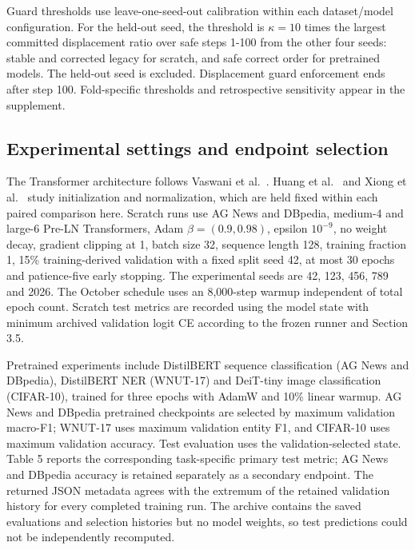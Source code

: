 \documentclass[referee,pdflatex,sn-mathphys-num]{sn-jnl}
\begin{document}
Guard thresholds use leave-one-seed-out calibration within each dataset/model configuration. For the held-out seed, the threshold is \(\kappa=10\) times the largest committed displacement ratio over safe steps 1-100 from the other four seeds: stable and corrected legacy for scratch, and safe correct order for pretrained models. The held-out seed is excluded. Displacement guard enforcement ends after step 100. Fold-specific thresholds and retrospective sensitivity appear in the supplement.

\subsection{Experimental settings and endpoint selection}\label{experimental-settings-and-endpoint-selection}

The Transformer architecture follows Vaswani et al.~\citep{vaswani2017attention}. Huang et al.~\citep{huang2020initialization} and Xiong et al.~\citep{xiong2020layernorm} study initialization and normalization, which are held fixed within each paired comparison here. Scratch runs use AG News and DBpedia, medium-4 and large-6 Pre-LN Transformers, Adam \(\beta=(0.9,0.98)\), epsilon \(10^{-9}\), no weight decay, gradient clipping at 1, batch size 32, sequence length 128, training fraction 1, 15\% training-derived validation with a fixed split seed 42, at most 30 epochs and patience-five early stopping. The experimental seeds are 42, 123, 456, 789 and 2026. The October schedule uses an 8,000-step warmup independent of total epoch count. Scratch test metrics are recorded using the model state with minimum archived validation logit CE according to the frozen runner and Section 3.5.

Pretrained experiments include DistilBERT sequence classification (AG News and DBpedia), DistilBERT NER (WNUT-17) and DeiT-tiny image classification (CIFAR-10), trained for three epochs with AdamW \citep{loshchilov2019decoupled} and 10\% linear warmup. AG News and DBpedia pretrained checkpoints are selected by maximum validation macro-F1; WNUT-17 uses maximum validation entity F1, and CIFAR-10 uses maximum validation accuracy. Test evaluation uses the validation-selected state. Table 5 reports the corresponding task-specific primary test metric; AG News and DBpedia accuracy is retained separately as a secondary endpoint. The returned JSON metadata agrees with the extremum of the retained validation history for every completed training run. The archive contains the saved evaluations and selection histories but no model weights, so test predictions could not be independently recomputed.
\end{document}
